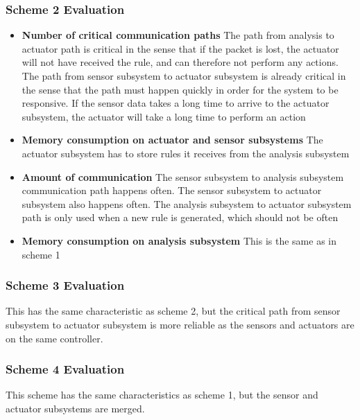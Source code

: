 \subsubsection{Scheme 2 Evaluation}
\begin{itemize}
\item \textbf{Number of critical communication paths} The path from analysis to actuator path is critical in the sense that if the packet is lost, the actuator will not have received the rule, and can therefore not perform any actions. The path from sensor subsystem to actuator subsystem is already critical in the sense that the path must happen quickly in order for the system to be responsive. If the sensor data takes a long time to arrive to the actuator subsystem, the actuator will take a long time to perform an action
\item \textbf{Memory consumption on actuator and sensor subsystems} The actuator subsystem has to store rules it receives from the analysis subsystem
\item \textbf{Amount of communication} The sensor subsystem to analysis subsystem communication path happens often. The sensor subsystem to actuator subsystem also happens often. The analysis subsystem to actuator subsystem path is only used when a new rule is generated, which should not be often
\item \textbf{Memory consumption on analysis subsystem} This is the same as in scheme 1
\end{itemize}

\subsubsection{Scheme 3 Evaluation}
This has the same characteristic as scheme 2, but the critical path from sensor subsystem to actuator subsystem is more reliable as the sensors and actuators are on the same controller.

\subsubsection{Scheme 4 Evaluation}
This scheme has the same characteristics as scheme 1, but the sensor and actuator subsystems are merged.

